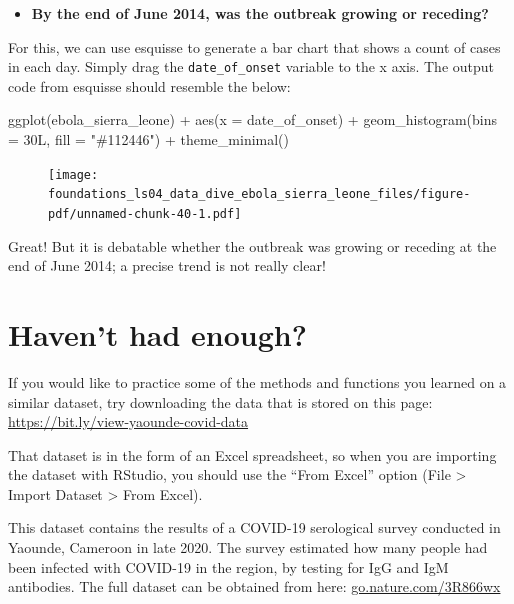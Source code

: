 \documentclass[
  letterpaper,
  DIV=11,
  numbers=noendperiod]{scrreprt}
\newenvironment{Shaded}{\begin{snugshade}}{\end{snugshade}}
\newcommand{\AttributeTok}[1]{\textcolor[rgb]{0.40,0.45,0.13}{#1}}
\newcommand{\FunctionTok}[1]{\textcolor[rgb]{0.28,0.35,0.67}{#1}}
\newcommand{\NormalTok}[1]{\textcolor[rgb]{0.00,0.23,0.31}{#1}}
\newcommand{\SpecialCharTok}[1]{\textcolor[rgb]{0.37,0.37,0.37}{#1}}
\newcommand{\StringTok}[1]{\textcolor[rgb]{0.13,0.47,0.30}{#1}}
\providecommand{\tightlist}{%
  \setlength{\itemsep}{0pt}\setlength{\parskip}{0pt}}\usepackage{longtable,booktabs,array}
\begin{document}
\begin{itemize}
\tightlist
\item
  \textbf{By the end of June 2014, was the outbreak growing or
  receding?}
\end{itemize}

For this, we can use esquisse to generate a bar chart that shows a count
of cases in each day. Simply drag the \texttt{date\_of\_onset} variable
to the x axis. The output code from esquisse should resemble the below:

\begin{Shaded}
\begin{Highlighting}[]
\FunctionTok{ggplot}\NormalTok{(ebola\_sierra\_leone) }\SpecialCharTok{+}
  \FunctionTok{aes}\NormalTok{(}\AttributeTok{x =}\NormalTok{ date\_of\_onset) }\SpecialCharTok{+}
  \FunctionTok{geom\_histogram}\NormalTok{(}\AttributeTok{bins =}\NormalTok{ 30L, }\AttributeTok{fill =} \StringTok{"\#112446"}\NormalTok{) }\SpecialCharTok{+}
  \FunctionTok{theme\_minimal}\NormalTok{()}
\end{Highlighting}
\end{Shaded}

\begin{figure}[H]

{\centering \texttt{[image: foundations\_ls04\_data\_dive\_ebola\_sierra\_leone\_files/figure-pdf/unnamed-chunk-40-1.pdf]}

}

\end{figure}

Great! But it is debatable whether the outbreak was growing or receding
at the end of June 2014; a precise trend is not really clear!

\hypertarget{havent-had-enough}{%
\section{Haven't had enough?}\label{havent-had-enough}}

If you would like to practice some of the methods and functions you
learned on a similar dataset, try downloading the data that is stored on
this page: \url{https://bit.ly/view-yaounde-covid-data}

That dataset is in the form of an Excel spreadsheet, so when you are
importing the dataset with RStudio, you should use the ``From Excel''
option (File \textgreater{} Import Dataset \textgreater{} From Excel).

This dataset contains the results of a COVID-19 serological survey
conducted in Yaounde, Cameroon in late 2020. The survey estimated how
many people had been infected with COVID-19 in the region, by testing
for IgG and IgM antibodies. The full dataset can be obtained from here:
\href{https://go.nature.com/3R866wx}{go.nature.com/3R866wx}
\end{document}
